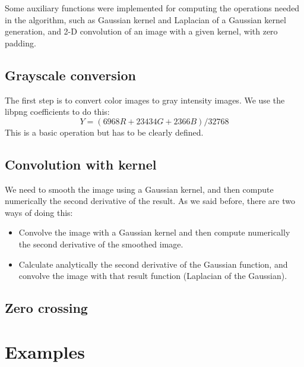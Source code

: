\documentclass{ipol}
\begin{document}
Some auxiliary functions were implemented for computing the operations
needed in the algorithm, such as Gaussian kernel and Laplacian of a Gaussian 
kernel generation, and 2-D convolution of an image with a given kernel, 
with zero padding.\\

\subsection{Grayscale conversion}

The first step is to convert color images to gray intensity images. We use
the libpng coefficients to do this:
$$
Y = (6968 R + 23434 G + 2366 B) / 32768
$$
This is a basic operation but has to be clearly defined.\\

\subsection{Convolution with kernel}

We need to smooth the image using a Gaussian kernel, and then compute numerically the second derivative of the result. As we said before, there are two ways of doing this:\\
\begin{itemize}
	\item Convolve the image with a Gaussian kernel and then compute numerically the second derivative of the smoothed image.
	\item Calculate analytically the second derivative of the Gaussian function, and convolve the image with that result function (Laplacian of the Gaussian).\\
\end{itemize}

\subsection{Zero crossing}

\section{Examples}
\label{sec:examples}
\end{document}
